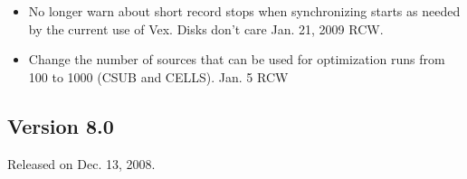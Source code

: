 \documentclass{report}
\begin{document}
\begin{itemize}
\item No longer warn about short record stops when synchronizing
starts as needed by the current use of Vex.  Disks don't care
Jan. 21, 2009  RCW.

\item Change the number of sources that can be used for optimization
runs from 100 to 1000 (CSUB and CELLS).  Jan. 5 RCW



\end{itemize}



\subsection{\label{SSEC:VER_8.0}Version 8.0}

Released on Dec. 13, 2008.
\end{document}
